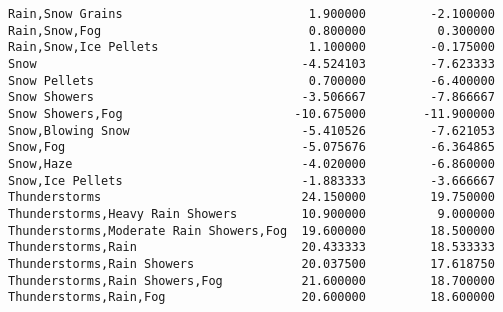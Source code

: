 \documentclass[11pt]{article}
\begin{document}
\begin{tcolorbox}[breakable, size=fbox, boxrule=.5pt, pad at break*=1mm, opacityfill=0]
\begin{Verbatim}[commandchars=\\\{\}]
Rain,Snow Grains                          1.900000         -2.100000
Rain,Snow,Fog                             0.800000          0.300000
Rain,Snow,Ice Pellets                     1.100000         -0.175000
Snow                                     -4.524103         -7.623333
Snow Pellets                              0.700000         -6.400000
Snow Showers                             -3.506667         -7.866667
Snow Showers,Fog                        -10.675000        -11.900000
Snow,Blowing Snow                        -5.410526         -7.621053
Snow,Fog                                 -5.075676         -6.364865
Snow,Haze                                -4.020000         -6.860000
Snow,Ice Pellets                         -1.883333         -3.666667
Thunderstorms                            24.150000         19.750000
Thunderstorms,Heavy Rain Showers         10.900000          9.000000
Thunderstorms,Moderate Rain Showers,Fog  19.600000         18.500000
Thunderstorms,Rain                       20.433333         18.533333
Thunderstorms,Rain Showers               20.037500         17.618750
Thunderstorms,Rain Showers,Fog           21.600000         18.700000
Thunderstorms,Rain,Fog                   20.600000         18.600000


\end{Verbatim}
\end{tcolorbox}
\end{document}
